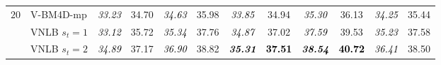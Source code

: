\documentclass[10pt, journal, twocolumn, final, a4paper]{IEEEtran}
\newcommand{\bsic}[1]{\textcolor{black}{\textit{#1}}}
\newcommand{\Bsic}[1]{\textcolor{black}{\textbf{\textit{#1}}}}
\newcommand{\Best}[1]{\textbf{\textcolor{black}{#1}}}
\begin{document}
\begin{table}[htp!]
\begin{center}
{\begin{tabular}{ c | l |c c | c c | c c | c c | c c}
%
			\multirow{1}{*}{$20$}
			                      & V-BM4D-mp            & \bsic{33.23} &       34.70  & \bsic{34.63} &       35.98  & \bsic{33.85} &       34.94  & \bsic{35.30} &       36.13  & \bsic{34.25} &       35.44  \\
			                      & VNLB   $s_t = 1$     & \bsic{33.12} &       35.72  & \bsic{35.34} &       37.76  & \bsic{34.87} &       37.02  & \bsic{37.59} &       39.53  & \bsic{35.23} &       37.58  \\
			                      & VNLB   $s_t = 2$     & \bsic{34.89} &       37.17  & \bsic{36.90} &       38.82  & \Bsic{35.31} & \Best{37.51} & \Bsic{38.54} & \Best{40.72} & \bsic{36.41} &       38.50  \\

\end{tabular}}
\end{center}
\end{table}
\end{document}

